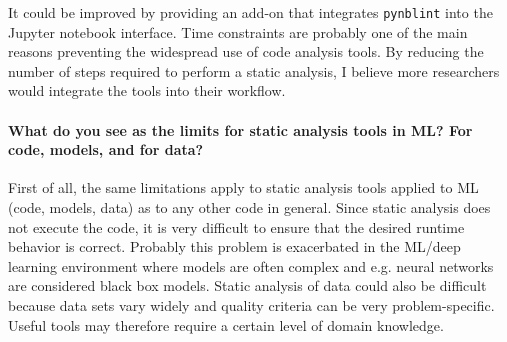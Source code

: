 \documentclass{article}
\begin{document}
It could be improved by providing an add-on that integrates \texttt{pynblint} into the Jupyter notebook interface. Time constraints are probably one of the main reasons preventing the widespread use of code analysis tools. By reducing the number of steps required to perform a static analysis, I believe more researchers would integrate the tools into their workflow.

\paragraph{What do you see as the limits for static analysis tools in ML? For code, models, and for data?}

First of all, the same limitations apply to static analysis tools applied to ML (code, models, data) as to any other code in general. Since static analysis does not execute the code, it is very difficult to ensure that the desired runtime behavior is correct. Probably this problem is exacerbated in the ML/deep learning environment where models are often complex and e.g. neural networks are considered black box models. Static analysis of data could also be difficult because data sets vary widely and quality criteria can be very problem-specific. Useful tools may therefore require a certain level of domain knowledge.
\end{document}
